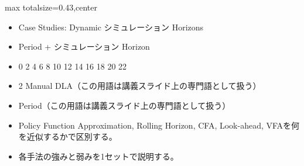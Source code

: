\clearpage
{}
\begin{minipage}[t]{0.405\textwidth}
\begin{adjustbox}{max totalsize={\textwidth}{0.43\textheight},center}
\begin{minipage}{\textwidth}\scriptsize
{}\begin{itemize}
\item Case Studies: Dynamic シミュレーション Horizons
\item Period + シミュレーション Horizon
\item 0 2 4 6 8 10 12 14 16 18 20 22
\item 2 Manual DLA（この用語は講義スライド上の専門語として扱う）
\item Period（この用語は講義スライド上の専門語として扱う）
\end{itemize}\begin{itemize}
\item Policy Function Approximation, Rolling Horizon, CFA, Look-ahead, VFAを何を近似するかで区別する。
\item 各手法の強みと弱みを1セットで説明する。
\end{itemize}
\end{minipage}
\end{adjustbox}
\end{minipage}\hfill
